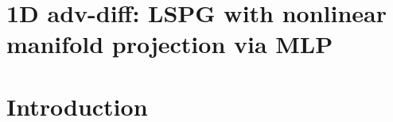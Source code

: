\let\mypdfximage\pdfximage\def\pdfximage{\immediate\mypdfximage}\documentclass[twoside]{book}
\newcommand{\+}{\discretionary{\mbox{\scriptsize$\hookleftarrow$}}{}{}}
\newcommand{\clearemptydoublepage}{%
  \newpage{\pagestyle{empty}\cleardoublepage}%
}
\begin{document}
\chapter{1D adv-\/diff\+: LSPG with nonlinear manifold projection via MLP}
\label{md_pages_demos_demo6}

\chapter{Introduction}
\label{md_pages_introduction}


\backmatter
\newpage
{}
\clearemptydoublepage
{}
\printindex
\end{document}
